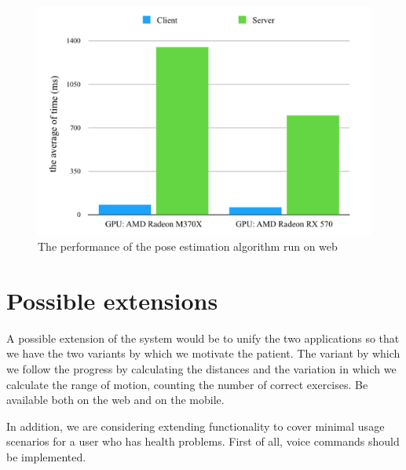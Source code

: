  \begin{figure}[htbp]
	\centerline{\includegraphics[scale=0.7]{fig/web-performace.png}}  
	\caption{The performance of the pose estimation algorithm run on web}
	\label{fig:web-perf}
\end{figure}

\section{Possible extensions}

A possible extension of the system would be to unify the two applications so that we have the two variants by which we motivate the patient. The variant by which we follow the progress by calculating the distances and the variation in which we calculate the range of motion, counting the number of correct exercises.
Be available both on the web and on the mobile.

In addition, we are considering extending functionality to cover minimal usage scenarios for a user who has health problems. First of all, voice commands should be implemented.

